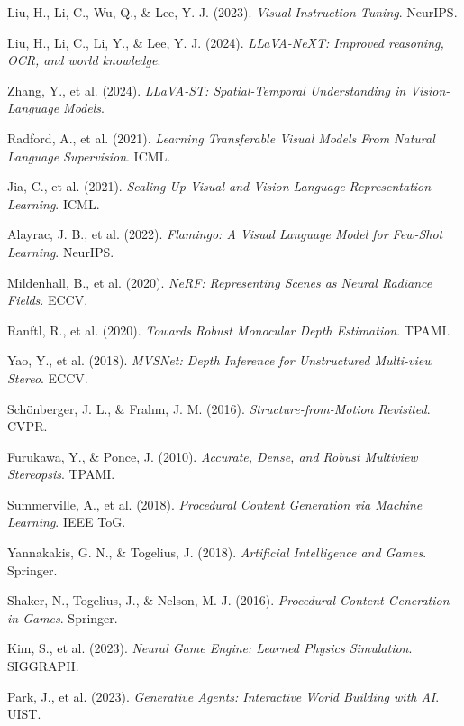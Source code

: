 \documentclass[11pt,a4paper]{article}
\begin{document}

\begin{thebibliography}{99}

Liu, H., Li, C., Wu, Q., \& Lee, Y. J. (2023).
\textit{Visual Instruction Tuning}.
NeurIPS.

Liu, H., Li, C., Li, Y., \& Lee, Y. J. (2024).
\textit{LLaVA-NeXT: Improved reasoning, OCR, and world knowledge}.

Zhang, Y., et al. (2024).
\textit{LLaVA-ST: Spatial-Temporal Understanding in Vision-Language Models}.

Radford, A., et al. (2021).
\textit{Learning Transferable Visual Models From Natural Language Supervision}.
ICML.

Jia, C., et al. (2021).
\textit{Scaling Up Visual and Vision-Language Representation Learning}.
ICML.

Alayrac, J. B., et al. (2022).
\textit{Flamingo: A Visual Language Model for Few-Shot Learning}.
NeurIPS.

Mildenhall, B., et al. (2020).
\textit{NeRF: Representing Scenes as Neural Radiance Fields}.
ECCV.

Ranftl, R., et al. (2020).
\textit{Towards Robust Monocular Depth Estimation}.
TPAMI.

Yao, Y., et al. (2018).
\textit{MVSNet: Depth Inference for Unstructured Multi-view Stereo}.
ECCV.

Schönberger, J. L., \& Frahm, J. M. (2016).
\textit{Structure-from-Motion Revisited}.
CVPR.

Furukawa, Y., \& Ponce, J. (2010).
\textit{Accurate, Dense, and Robust Multiview Stereopsis}.
TPAMI.

Summerville, A., et al. (2018).
\textit{Procedural Content Generation via Machine Learning}.
IEEE ToG.

Yannakakis, G. N., \& Togelius, J. (2018).
\textit{Artificial Intelligence and Games}.
Springer.

Shaker, N., Togelius, J., \& Nelson, M. J. (2016).
\textit{Procedural Content Generation in Games}.
Springer.

Kim, S., et al. (2023).
\textit{Neural Game Engine: Learned Physics Simulation}.
SIGGRAPH.

Park, J., et al. (2023).
\textit{Generative Agents: Interactive World Building with AI}.
UIST.

\end{thebibliography}
\end{document}
